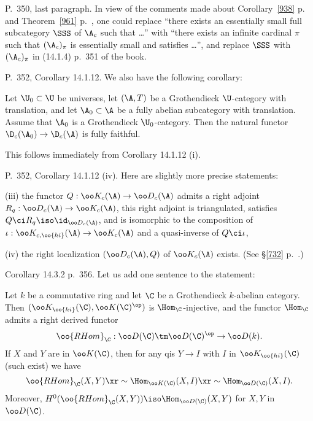 \documentclass[12pt]{article}
\theoremstyle{remark}
\theoremstyle{definition}
\begin{document}


\begin{s} 
P.~350, last paragraph. In view of the comments made about Corollary~\ref{938} p.~ and Theorem~\ref{961} p.~, one could replace ``there exists an essentially small full subcategory $\SSS$ of $\A_c$ such that \dots'' with ``there exists an infinite cardinal $\pi$ such that $(\A_c)_\pi$ is essentially small and satisfies \dots'', and replace $\SSS$ with $(\A_c)_\pi$ in (14.1.4) p.~351 of the book.
\end{s}

%

\begin{s}
P.~352, Corollary 14.1.12. We also have the following corollary: 

Let $\U_0\subset\U$ be universes, let $(\A,T)$ be a Grothendieck $\U$-category with translation, and let $\A_0\subset\A$ be a fully abelian subcategory with translation. Assume that $\A_0$ is a Grothendieck $\U_0$-category. Then the natural functor $\D_c(\A_0)\to\D_c(\A)$ is fully faithful.

This follows immediately from Corollary 14.1.12 (i). 
\end{s}

%

\begin{s} 
P.~352, Corollary 14.1.12 (iv). Here are slightly more precise statements:

\nn(iii) the functor $Q:\oo K_c(\A)\to\oo D_c(\A)$ admits a right adjoint $R_q:\oo D_c(\A)\to\oo K_c(\A)$, this right adjoint is triangulated, satisfies $Q\ci R_q\iso\id_{\oo D_c(\A)}$, and is isomorphic to the composition of $\iota:\oo K_{c,\oo{hi}}(\A)\to\oo K_c(\A)$ and a quasi-inverse of $Q\ci\iota$,

\nn(iv) the right localization $(\oo D_c(\A),Q)$ of $\oo K_c(\A)$ exists. %
(See \S\ref{732} p.~.)
\end{s}

%

\begin{s}
Corollary 14.3.2 p.~356. Let us add one sentence to the statement:
%
\begin{cor}
Let $k$ be a commutative ring and let $\C$ be a Grothendieck $k$-abelian category. Then $(\oo K_{\oo{hi}}(\C),\oo K(\C)^{\op})$ is $\Hom_\C$-injective, and the functor $\Hom_\C$ admits a right derived functor 
$$
\oo{RHom}_\C:\oo D(\C)\tm\oo D(\C)^{\op}\to\oo D(k).
$$ 
If $X$ and $Y$ are in $\oo K(\C)$, then for any qis $Y\to I$ with $I$ in $\oo K_{\oo{hi}}(\C)$ (such exist) we have 
$$
\oo{RHom}_\C(X,Y)\xr\sim\Hom_{\oo K(\C)}(X,I)\xr\sim\Hom_{\oo D(\C)}(X,I).
$$ 
Moreover, $H^0(\oo{RHom}_\C(X,Y))\iso\Hom_{\oo D(\C)}(X,Y)$ for $X,Y$ in $\oo D(\C)$.
\end{cor}
\end{s}
\end{document}
